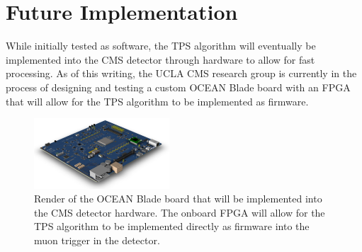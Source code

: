 \section{Future Implementation}
\label{subsec:TPSResults}

While initially tested as software, the TPS algorithm will eventually be implemented into the CMS detector through hardware to allow for fast processing.
As of this writing, the UCLA CMS research group is currently in the process of designing and testing a custom OCEAN Blade board with an FPGA that will allow for the TPS algorithm to be implemented as firmware.

\begin{figure}[htbp] %
  \centering
  \includegraphics[width=0.45\textwidth]{fig/TPS/ocean.pdf}
  \caption{
    Render of the OCEAN Blade board that will be implemented into the CMS detector hardware.
    The onboard FPGA will allow for the TPS algorithm to be implemented directly as firmware into the muon trigger in the detector.
  }
  \label{fig:ocean}
\end{figure}
